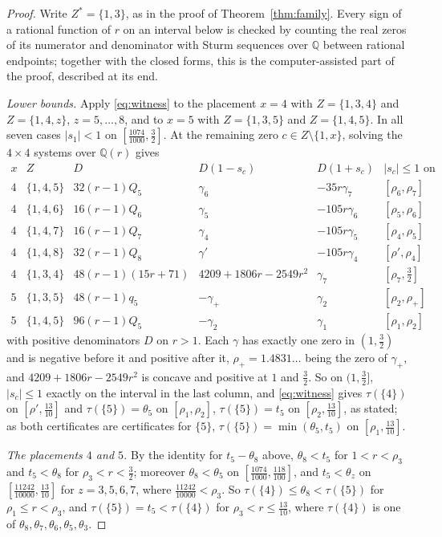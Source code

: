 \documentclass[11pt]{article}
\begin{document}
\begin{proof}
Write $Z^*=\{1,3\}$, as in the proof of Theorem~\ref{thm:family}.  Every
sign of a rational function of $r$ on an interval below is checked by
counting the real zeros of its numerator and denominator with Sturm
sequences over $\mathbb Q$ between rational endpoints; together with the
closed forms, this is the computer-assisted part of the proof, described
at its end.

\emph{Lower bounds.}  Apply \eqref{eq:witness} to the placement $x=4$ with
$Z=\{1,3,4\}$ and $Z=\{1,4,z\}$, $z=5,\ldots,8$, and to $x=5$ with
$Z=\{1,3,5\}$ and $Z=\{1,4,5\}$.  In all seven cases $|s_1|<1$ on
$[\tfrac{1074}{1000},\tfrac32]$.  At the remaining zero $c\in Z\setminus\{1,x\}$,
solving the $4\times4$ systems over $\mathbb Q(r)$ gives
\[
\begin{array}{cccccc}
  x & Z & D & D(1-s_c) & D(1+s_c) & |s_c|\le1\text{ on}\\[2pt]
  4 & \{1,4,5\} & 32(r-1)Q_5 & \gamma_6 & -35r\gamma_7 & [\rho_6,\rho_7]\\
  4 & \{1,4,6\} & 16(r-1)Q_6 & \gamma_5 & -105r\gamma_6 & [\rho_5,\rho_6]\\
  4 & \{1,4,7\} & 16(r-1)Q_7 & \gamma_4 & -105r\gamma_5 & [\rho_4,\rho_5]\\
  4 & \{1,4,8\} & 32(r-1)Q_8 & \gamma' & -105r\gamma_4 & [\rho',\rho_4]\\
  4 & \{1,3,4\} & 48(r-1)(15r+71) & 4209+1806r-2549r^2 & \gamma_7 & [\rho_7,\tfrac32]\\
  5 & \{1,3,5\} & 48(r-1)q_5 & -\gamma_+ & \gamma_2 & [\rho_2,\rho_+]\\
  5 & \{1,4,5\} & 96(r-1)Q_5 & -\gamma_2 & \gamma_1 & [\rho_1,\rho_2]
\end{array}
\]
with positive denominators $D$ on $r>1$.  Each $\gamma$ has exactly one
zero in $(1,\tfrac32)$ and is negative before it and positive after it, $\rho_+=1.4831\ldots$ being the zero of
$\gamma_+$, and $4209+1806r-2549r^2$ is concave and positive at $1$ and
$\tfrac32$.  So on $(1,\tfrac32]$, $|s_c|\le1$ exactly on the interval in the
last column, and
\eqref{eq:witness} gives $\tau(\{4\})$ on $[\rho',\tfrac{13}{10}]$ and
$\tau(\{5\})=\theta_5$ on $[\rho_1,\rho_2]$, $\tau(\{5\})=t_5$ on
$[\rho_2,\tfrac{13}{10}]$, as stated; as both certificates are certificates
for $\{5\}$, $\tau(\{5\})=\min(\theta_5,t_5)$ on $[\rho_1,\tfrac{13}{10}]$.

\emph{The placements $4$ and $5$.}  By the identity for $t_5-\theta_8$
above, $\theta_8<t_5$ for $1<r<\rho_3$ and $t_5<\theta_8$ for
$\rho_3<r<\tfrac32$; moreover $\theta_8<\theta_5$ on
$[\tfrac{1074}{1000},\tfrac{118}{100}]$, and $t_5<\theta_z$ on
$[\tfrac{11242}{10000},\tfrac{13}{10}]$ for $z=3,5,6,7$, where
$\tfrac{11242}{10000}<\rho_3$.  So $\tau(\{4\})\le\theta_8<\tau(\{5\})$ for
$\rho_1\le r<\rho_3$, and $\tau(\{5\})=t_5<\tau(\{4\})$ for
$\rho_3<r\le\tfrac{13}{10}$, where $\tau(\{4\})$ is one of
$\theta_8,\theta_7,\theta_6,\theta_5,\theta_3$.


\end{proof}
\end{document}
